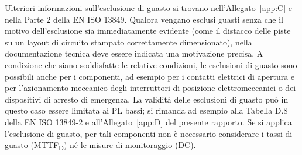 Ulteriori informazioni sull'esclusione di guasto si trovano nell'Allegato~\ref{app:C} e nella Parte 2 della EN ISO 13849. Qualora vengano esclusi guasti senza che il motivo dell'esclusione sia immediatamente evidente (come il distacco delle piste su un layout di circuito stampato correttamente dimensionato), nella documentazione tecnica deve essere indicata una motivazione precisa. A condizione che siano soddisfatte le relative condizioni, le esclusioni di guasto sono possibili anche per i componenti, ad esempio per i contatti elettrici di apertura e per l'azionamento meccanico degli interruttori di posizione elettromeccanici o dei dispositivi di arresto di emergenza. La validità delle esclusioni di guasto può in questo caso essere limitata ai PL bassi; si rimanda ad esempio alla Tabella D.8 della EN ISO 13849-2 e all'Allegato~\ref{app:D} del presente rapporto. Se si applica l'esclusione di guasto, per tali componenti non è necessario considerare i tassi di guasto (MTTF\textsubscript{D}) né le misure di monitoraggio (DC).

